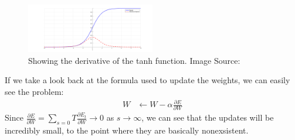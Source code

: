 \begin{figure}[ht]
    \centering
        \includegraphics[width=0.5\textwidth]{latex/imgs/tanh_deriv.png}
    \caption{Showing the derivative of the tanh function. Image Source:\cite{grad}}
\end{figure}
If we take a look back at the formula used to update the weights, we can easily see the problem:
\begin{align}
    W &\leftarrow W - \alpha \frac{\partial E}{\partial W}
\end{align}
Since $\frac{\partial E}{\partial W} = \sum_{s=0}{T} \frac{\partial E_t}{\partial W} \rightarrow 0$ as $s \rightarrow \infty$, we can see that the updates will be incredibly small, to the point where they are basically nonexsistent.
